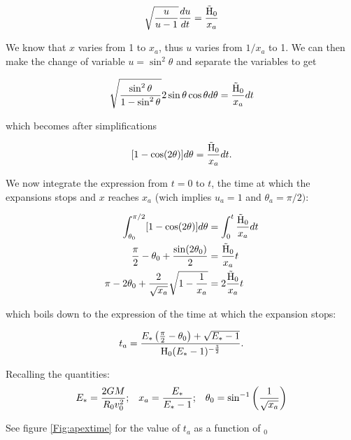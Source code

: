 \begin{equation}
\sqrt{\frac{u}{u-1}} \frac{du}{dt} = \frac{\tilde{{\textrm{H}}}_0}{x_a}
\end{equation}

We know that $x$ varies from 1 to $x_a$, thus $u$ varies from $1/x_a$ to 1. We can then make the change of variable $u = \sin^2\theta$ and separate the variables to get

\begin{equation}
\sqrt{\frac{\sin^2\theta}{1-\sin^2\theta}} 2 \sin\theta \cos\theta d \theta = \frac{\tilde{{\textrm{H}}}_0}{x_a} dt
\end{equation}

which becomes after simplifications

\begin{equation}
\label{Eq:1_integrand_theta}
[ 1 - \cos(2\theta)]d\theta = \frac{\tilde{{\textrm{H}}}_0}{x_a} dt .
\end{equation}


We now integrate the expression from $t=0$ to $t$, the time at which the expansions stops and $x$ reaches $x_a$ (wich implies $u_a = 1$ and $\theta_a = \pi /2)$:

\begin{align}
\int^{\pi/2}_{\theta_0} [ 1 - \cos(2\theta)]d\theta  & = \int^t_0 \frac{\tilde{{\textrm{H}}}_0}{x_a} dt\\
\frac{\pi}{2} - \theta_0 + \frac{\sin(2\theta_0)}{2} & =  \frac{\tilde{{\textrm{H}}}_0}{x_a} t\\
\pi - 2 \theta_0 + \frac{2}{\sqrt{x_a}}\sqrt{1-\frac{1}{x_a}} & = 2 \frac{\tilde{{\textrm{H}}}_0}{x_a} t 
\end{align}

which boils down to the expression of the time at which the expansion stops:

\begin{equation}
t_a = \frac{E_\ast \left(\frac{\pi}{2} - \theta_0\right) + \sqrt{E_\ast-1}}{{\textrm{H}}_0 (E_\ast-1)^{-\frac{3}{2}}}.
\end{equation}

Recalling the quantities:
\begin{align}
E_\ast = \frac{2GM}{R_0 v_0^2}        &;  & x_a=\frac{E_\ast}{E_\ast-1}  &;  &\theta_0 = \sin^{-1}\left(\frac{1}{\sqrt{x_a}}\right)  
\end{align}

See figure \ref{Fig:apextime} for the value of $t_a$ as a function of \Hub$_0$

